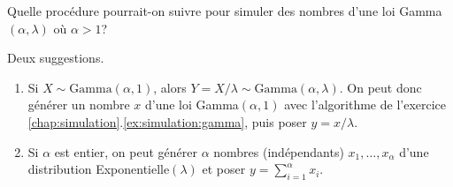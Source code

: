 \begin{exercice}
  Quelle procédure pourrait-on suivre pour simuler des nombres d'une
  loi Gamma$(\alpha, \lambda)$ où $\alpha > 1$?
  \begin{sol}
    Deux suggestions.
    \begin{enumerate}[1.]
    \item Si $X \sim \text{Gamma}(\alpha, 1)$, alors $Y = X/\lambda
      \sim \text{Gamma}(\alpha, \lambda)$. On peut donc générer un
      nombre $x$ d'une loi Gamma$(\alpha, 1)$ avec l'algorithme de
      l'exercice \ref{chap:simulation}.\ref{ex:simulation:gamma}, puis poser $y =
      x/\lambda$.
    \item Si $\alpha$ est entier, on peut générer $\alpha$ nombres
      (indépendants) $x_1, \dots, x_\alpha$ d'une distribution
      Exponentielle$(\lambda)$ et poser $y = \sum_{i=1}^\alpha x_i$.
    \end{enumerate}
  \end{sol}
\end{exercice}

